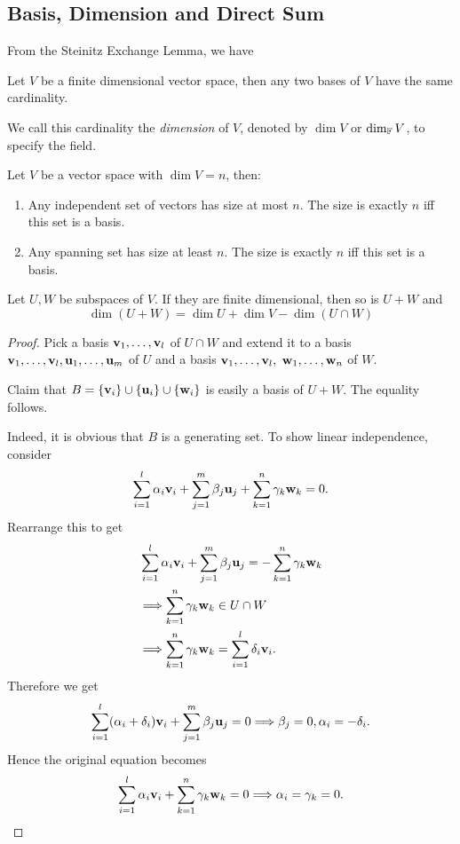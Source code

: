 \documentclass[a4paper,11pt]{article}
\begin{document}
\subsection{Basis, Dimension and Direct Sum}
From the Steinitz Exchange Lemma, we have
\begin{corollary}\label{dim_well_defined}
    Let $V$ be a finite dimensional vector space, then any two bases of $V$ have the same cardinality.
\end{corollary}
We call this cardinality the \textit{dimension} of $V$, denoted by $ \dim V $ or $ \dim_{\mathbb{F}} V $, to specify the field.
\begin{corollary}
    Let $V$ be a vector space with $\dim V=n$, then:
    \begin{enumerate}
        \item Any independent set of vectors has size at most $n$.
        The size is exactly $n$ iff this set is a basis.
        \item Any spanning set has size at least $n$.
        The size is exactly $n$ iff this set is a basis.
    \end{enumerate}
\end{corollary}
\begin{proposition}
    Let $U,W$ be subspaces of $V$.
    If they are finite dimensional, then so is $U+W$ and
    $$\dim(U+W)=\dim U+\dim V-\dim(U\cap W)$$
\end{proposition}
\begin{proof}
    Pick a basis ${\bf v}_1,\ldots,{\bf v}_l$ of $U\cap W$ and extend it to a basis ${\bf v}_1,\ldots,{\bf v}_l,{\bf u}_1,\ldots,{\bf u}_m$ of $U$ and a basis ${\bf v}_1,\ldots,{\bf v}_l,$ ${\bf w}_1,\ldots,{\bf w}_n$ of $W$. 
    
    Claim that $B=\{{\bf v}_i\}\cup\{{\bf u}_i\}\cup\{{\bf w}_i\}$ is easily a basis of $U+W$.
    The equality follows.

    Indeed, it is obvious that $B$ is a generating set. To show linear independence, consider 
    \[
        \sum_{i=1}^{l}\alpha_i {\bf v}_i+\sum_{j=1}^{m}\beta_j {\bf u}_j+\sum_{k=1}^{n}\gamma_k{\bf w}_k=0.
    \]
    Rearrange this to get 
    \[
        \begin{aligned}
           & \sum_{i=1}^{l}\alpha_i {\bf v}_i+\sum_{j=1}^{m}\beta_j {\bf u}_j=-\sum_{k=1}^{n}\gamma_k{\bf w}_k\\ &\Longrightarrow \sum_{k=1}^{n}\gamma_k{\bf w}_k\in U \cap W\\ &\Longrightarrow \sum_{k=1}^{n}\gamma_k{\bf w}_k=\sum_{i=1}^{l}\delta_i{\bf v}_i.
        \end{aligned}
    \]
    Therefore we get 
    \[
        \sum_{i=1}^{l}(\alpha_i+\delta_i){\bf v}_i+\sum_{j=1}^{m}\beta_j {\bf u}_j=0 \Longrightarrow \beta_j=0,\alpha_i=-\delta_i.
    \]
    Hence the original equation becomes 
    \[
        \sum_{i=1}^{l}\alpha_i{\bf v}_i+\sum_{k=1}^{n}\gamma_k{\bf w}_k=0 \Longrightarrow \alpha_i=\gamma_k=0.\qedhere
    \]
\end{proof}
\end{document}
